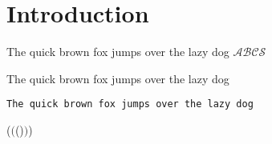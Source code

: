 \chapter{Introduction}

\noindent The quick brown fox jumps over the lazy dog $\mathscr{ABCS}$

\noindent\textsf{The quick brown fox jumps over the lazy dog}

\noindent\texttt{The quick brown fox jumps over the lazy dog}

($($()$)$)

\begin{dfn}
  \blindtext[1]
\end{dfn}

\Blindtext[2][1]

